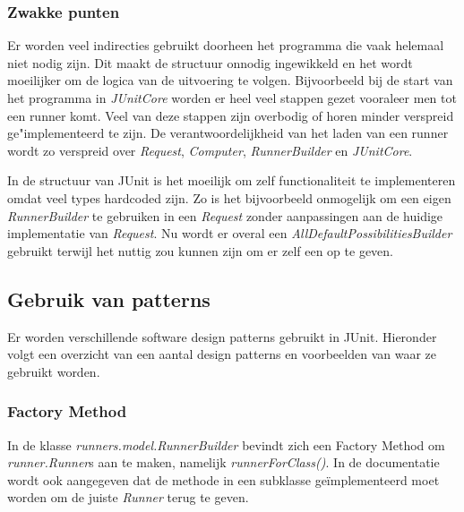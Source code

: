 \documentclass[i1]{oss}
\begin{document}
\subsubsection{Zwakke punten}
\begin{description}
\item Er worden veel indirecties gebruikt doorheen het programma die vaak helemaal niet nodig zijn. Dit maakt de structuur onnodig ingewikkeld en het wordt moeilijker om de logica van de uitvoering te volgen. Bijvoorbeeld bij de start van het programma in \emph{JUnitCore} worden er heel veel stappen gezet vooraleer men tot een runner komt. Veel van deze stappen zijn overbodig of horen minder verspreid ge"implementeerd te zijn. De verantwoordelijkheid van het laden van een runner wordt zo verspreid over \emph{Request}, \emph{Computer}, \emph{RunnerBuilder} en \emph{JUnitCore}. 

\item In de structuur van JUnit is het moeilijk om zelf functionaliteit te implementeren omdat veel types hardcoded zijn. Zo is het bijvoorbeeld onmogelijk om een eigen \emph{RunnerBuilder} te gebruiken in een \emph{Request} zonder aanpassingen aan de huidige implementatie van \emph{Request}. Nu wordt er overal een \emph{AllDefaultPossibilitiesBuilder} gebruikt terwijl het nuttig zou kunnen zijn om er zelf een op te geven.

\end{description}

\subsection{Gebruik van patterns}

Er worden verschillende software design patterns gebruikt in JUnit. 
Hieronder volgt een overzicht van een aantal design patterns en voorbeelden van waar ze gebruikt worden.

\subsubsection{Factory Method}
In de klasse \emph{runners.model.RunnerBuilder} bevindt zich een Factory Method om \emph{runner.Runner}s aan te maken, namelijk \emph{runnerForClass()}. 
In de documentatie wordt ook aangegeven dat de methode in een subklasse ge\"implementeerd moet worden om de juiste \emph{Runner} terug te geven.
\end{document}
